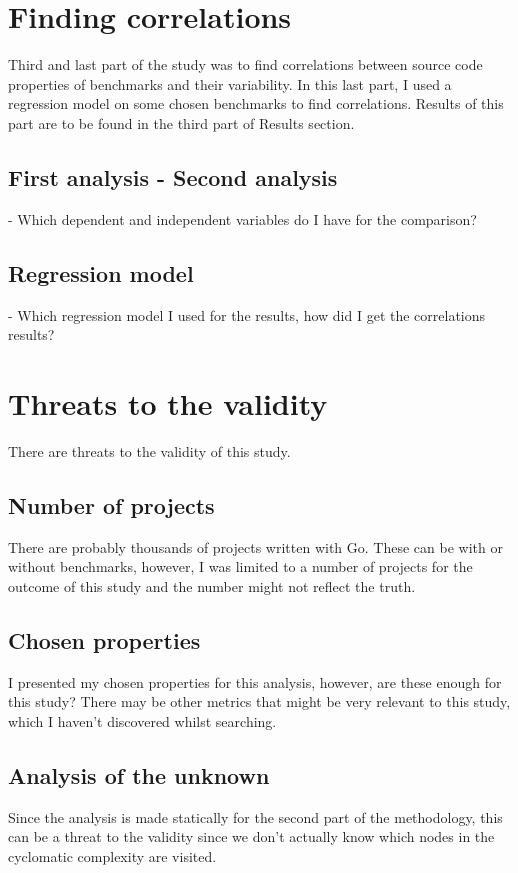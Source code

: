 \documentclass{seal_thesis}
\begin{document}
\section{Finding correlations}
Third and last part of the study was to find correlations between source code properties of benchmarks and their variability. In this last part, I used a regression model on some chosen benchmarks to find correlations. Results of this part are to be found in the third part of Results section.
\subsection{First analysis - Second analysis}
- Which dependent and independent variables do I have for the comparison?
\subsection{Regression model}
- Which regression model I used for the results, how did I get the correlations results?

\section{Threats to the validity}
There are threats to the validity of this study.
\subsection{Number of projects}
There are probably thousands of projects written with Go. These can be with or without benchmarks, however, I was limited to a number of projects for the outcome of this study and the number might not reflect the truth.

\subsection{Chosen properties}
I presented my chosen properties for this analysis, however, are these enough for this study? There may be other metrics that might be very relevant to this study, which I haven't discovered whilst searching.

\subsection{Analysis of the unknown}
Since the analysis is made statically for the second part of the methodology, this can be a threat to the validity since we don't actually know which nodes in the cyclomatic complexity are visited.
\end{document}
